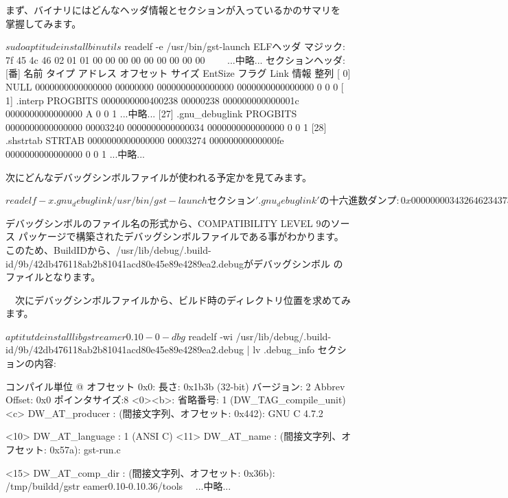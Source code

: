 \documentclass[mingoth,a4paper]{jsarticle}
\begin{document}
 まず、バイナリにはどんなヘッダ情報とセクションが入っているかのサマリを
掌握してみます。

\begin{commandline}
$ sudo aptitude install binutils
$ readelf -e /usr/bin/gst-launch
ELFヘッダ
   マジック:  7f 45 4c 46 02 01 01 00 00 00 00 00 00 00 00 00
　　...中略...
セクションヘッダ:
  [番] 名前              タイプ           アドレス          オフセット
       サイズ            EntSize          フラグ Link  情報  整列
  [ 0]                   NULL             0000000000000000  00000000
       0000000000000000  0000000000000000           0     0     0
  [ 1] .interp           PROGBITS         0000000000400238  00000238
       000000000000001c  0000000000000000   A       0     0     1
...中略...
  [27] .gnu_debuglink    PROGBITS         0000000000000000  00003240
       0000000000000034  0000000000000000           0     0     1
  [28] .shstrtab         STRTAB           0000000000000000  00003274
       00000000000000fe  0000000000000000           0     0     1
...中略...
\end{commandline}

 次にどんなデバッグシンボルファイルが使われる予定かを見てみます。

\begin{commandline}
$ readelf -x .gnu_debuglink /usr/bin/gst-launch
セクション '.gnu_debuglink' の 十六進数ダンプ:
  0x00000000 34326462 34373631 31386162 32623831 42db476118ab2b81
  0x00000010 30343161 63643830 65343565 38396534 041acd80e45e89e4
  0x00000020 32383965 61322e64 65627567 00000000 289ea2.debug....
  0x00000030 dbf8060d                            ....
$
\end{commandline}

 デバッグシンボルのファイル名の形式から、COMPATIBILITY LEVEL 9のソース
パッケージで構築されたデバッグシンボルファイルである事がわかります。
このため、BuildIDから、/usr/lib/debug/.build-id/9b/42db476118ab2b81041acd80e45e89e4289ea2.debugがデバッグシンボル
のファイルとなります。

　次にデバッグシンボルファイルから、ビルド時のディレクトリ位置を求めてみます。

\begin{commandline}
$ aptitutde install libgstreamer0.10-0-dbg
$ readelf -wi /usr/lib/debug/.build-id/9b/42db476118ab2b81041acd80e45e89e4289ea2.debug | lv
.debug_info セクションの内容:

  コンパイル単位 @ オフセット 0x0:
   長さ:        0x1b3b (32-bit)
   バージョン:    2
   Abbrev Offset: 0x0
   ポインタサイズ:8
 <0><b>: 省略番号: 1 (DW_TAG_compile_unit)
    <c>   DW_AT_producer    : (間接文字列、オフセット: 0x442): GNU C 4.7.2

    <10>   DW_AT_language    : 1        (ANSI C)
    <11>   DW_AT_name        : (間接文字列、オフセット: 0x57a): gst-run.c

    <15>   DW_AT_comp_dir    : (間接文字列、オフセット: 0x36b): /tmp/buildd/gstr
eamer0.10-0.10.36/tools
　...中略...
\end{commandline}
\end{document}
